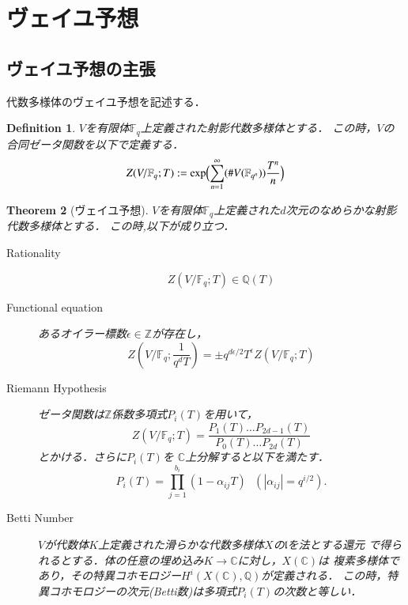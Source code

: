 \documentclass{ujarticle}
\newtheorem{thm}{Theorem}[section]
\newtheorem{dfn}[thm]{Definition}
\begin{document}
\section{ヴェイユ予想}
\label{sub:ヴェイユ予想}
\subsection{ヴェイユ予想の主張}
\label{subs:ゼータ関数とヴェイユ予想}

代数多様体のヴェイユ予想を記述する．
\begin{dfn}
    $V$を有限体$\mathbb{F}_q$上定義された射影代数多様体とする．
    この時，$V$の合同ゼータ関数を以下で定義する．
    \begin{equation*}
     Z(V/\mathbb{F}_q;T):= \mathrm{exp}\Bigl( \sum_{n=1}^{\infty}(\#V(\mathbb{F}_{q^n}))\frac{T^n}{n} \Bigr)
    \end{equation*}
\end{dfn}

\begin{thm}[ヴェイユ予想]
  $V$を有限体$\mathbb{F}_q$上定義された$d$次元のなめらかな射影代数多様体とする．
  この時,以下が成り立つ．
  \begin{description}
    \item[Rationality]
    \begin{equation*}
      Z(V/\mathbb{F}_q;T) \in \mathbb{Q}(T)
    \end{equation*}
    \item[Functional equation]
    あるオイラー標数$ \epsilon \in \mathbb{Z}$が存在し，
    \begin{equation}
      Z(V/\mathbb{F}_q;\frac{1}{q^dT})=\pm
      q^{d \epsilon/2}T^{\epsilon}Z(V/\mathbb{F}_q;T)
    \end{equation}
    \item[Riemann Hypothesis]
    ゼータ関数は$\mathbb{Z}$係数多項式$P_i(T)$を用いて，
    \begin{equation}
     Z(V/\mathbb{F}_q;T)=
     \frac{P_1(T)\dots P_{2d-1}(T)}{P_0(T)\dots P_{2d}(T)}
    \end{equation}
    とかける．さらに$P_i(T)$を
    $ \mathbb{C} $上分解すると以下を満たす．
    \begin{equation*}
     P_i(T)= \prod_{j=1}^{b_i}(1-\alpha_{ij}T) \mbox{ }
      (|\alpha_{ij}|=q^{i/2}).
    \end{equation*}
    \item[Betti Number]
    $V$が代数体$K$上定義された滑らかな代数多様体$X$の$\mathfrak{l}$を法とする還元
    で得られるとする．体の任意の埋め込み$K \to \mathbb{C}$に対し，$X(\mathbb{C})$は
    複素多様体であり，その特異コホモロジー$H^i(X(\mathbb{C}),\mathbb{Q})$が定義される．
    この時，特異コホモロジーの次元(Betti数)は多項式$P_i(T)$の次数と等しい．
  \end{description}
\end{thm}
\end{document}

